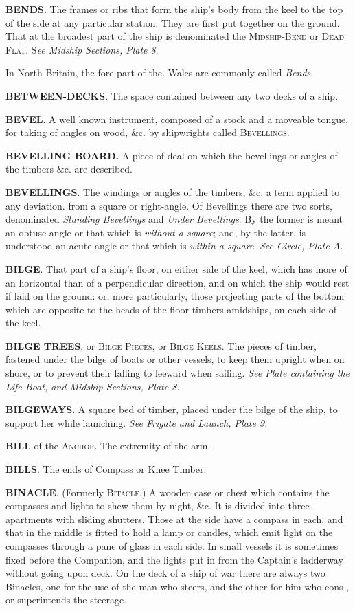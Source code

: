 \textbf{BENDS}. The frames or ribs that form the ship’s body from the keel to the top of the side at any particular station. They are first put together on the ground. That at the broadest part of the ship is denominated the \textsc{Midship-Bend} or \textsc{Dead Flat}. S\textit{ee Midship Sections, Plate 8}. 

In North Britain, the fore part of the. Wales are commonly called \textit{Bends}. 

\textbf{BETWEEN-DECKS}. The space contained between any two decks of a ship. 

\textbf{BEVEL}. A well known instrument, composed of a stock and a moveable tongue, for taking of angles on wood, \&c. by shipwrights called \textsc{Bevellings}. 

\textbf{BEVELLING BOARD.} A piece of deal on which the bevellings or angles of the timbers \&c. are described. 

\textbf{BEVELLINGS}. The windings or angles of the timbers, \&c. a term applied to any deviation. from a square or right-angle. Of Bevellings there are two sorts, denominated \textit{Standing Bevellings} and \textit{Under Bevellings}. By the former is meant an obtuse angle or that which is \textit{without a square}; and, by the latter, is understood an acute angle or that which is \textit{within a square}. \textit{See Circle, Plate A.}

\textbf{BILGE}. That part of a ship's floor, on either side of the keel, which has more of an horizontal than of a perpendicular direction, and on which the ship would rest if laid on the ground: or, more particularly, those projecting parts of the bottom which are opposite to the heads of the floor-timbers amidships, on each side of the keel. 

\textbf{BILGE TREES}, or \textsc{Bilge Pieces}, or \textsc{Bilge Keels}. The pieces of timber, fastened under the bilge of boats or other vessels, to keep them upright when on shore, or to prevent their falling to leeward when sailing. \textit{See Plate containing the Life Boat, and Midship Sections, Plate 8.}

\textbf{BILGEWAYS}. A square bed of timber, placed under the bilge of the ship, to support her while launching. \textit{See Frigate and Launch, Plate 9.}

\textbf{BILL} of the \textsc{Anchor}. The extremity of the arm. 

\textbf{BILLS}. The ends of Compass or Knee Timber. 

\textbf{BINACLE}. (Formerly \textsc{Bitacle}.) A wooden case or chest which contains the compasses and lights to shew them by night, \&c. It is divided into three apartments with sliding shutters. Those at the side have a compass in each, and that in the middle is fitted to hold a lamp or candles, which emit light on the compasses through a pane of glass in each side. In small vessels it is sometimes fixed before the Companion, and the lights put in from the Captain's ladderway without going upon deck. On the deck of a ship of war there are always two Binacles, one for the use of the man who steers, and the other for him who cons , or superintends the steerage. 

